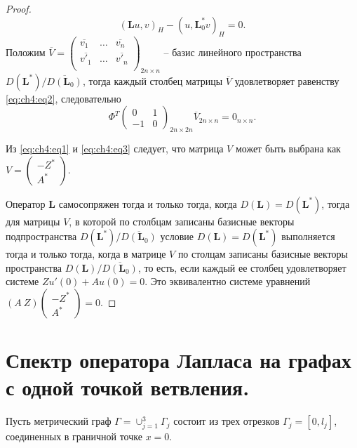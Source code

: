 \begin{proof}
\begin{equation}
\left( \mathbf{L} u, v\right)_H - \left( u, \mathbf{L}_0^* v\right)_H =0.
\label{eq:ch4:eq2}
\end{equation}
Положим $\overline{V} = \begin{pmatrix}
           \overline{v_1} & \ldots & \overline{v_n} \\
           \overline{v'_1} & \ldots & \overline{v'_n} \\
\end{pmatrix}_{2n \times n}$ -- базис линейного пространства $D(\mathbf{L^*}) / \overline{D(\mathbf{L}_0)}$, тогда каждый столбец матрицы $\overline{V}$ удовлетворяет равенству \eqref{eq:ch4:eq2}, следовательно 
\begin{equation}
\Phi^T \begin{pmatrix}
           0 & 1 \\
           -1 & 0
\end{pmatrix}_{2n \times 2n} \overline{V}_{2n \times n} = 0_{n \times n}.
\label{eq:ch4:eq3}
\end{equation}

Из \eqref{eq:ch4:eq1} и \eqref{eq:ch4:eq3} следует, что матрица $V$ может быть выбрана как $V=
\begin{pmatrix}
           -Z^* \\
           A^*
\end{pmatrix}. $

Оператор $\mathbf{L}$ самосопряжен тогда и только тогда, когда $D(\mathbf{L})=D(\mathbf{L}^*)$, тогда для матрицы $V$, в которой по столбцам записаны базисные векторы подпространства  $D(\mathbf{L}^*)/\overline{D(\mathbf{L}_0)}$ условие $D(\mathbf{L})=D(\mathbf{L}^*)$ выполняется тогда и только тогда, когда в матрице $V$ по столцам записаны базисные векторы пространства $D(\mathbf{L})/\overline{D(\mathbf{L}_0)}$, то есть, если каждый ее столбец удовлетворяет системе $Z u'(0) + A u(0) =0$. Это эквивалентно системе уравнений 
$\left( A \  Z \right) \begin{pmatrix}
           -Z^* \\
           A^*
\end{pmatrix} = 0$.
\end{proof}

\section{Спектр оператора Лапласа на графах с одной точкой ветвления.}\label{sec:ch4/sect3}
Пусть метрический граф $\Gamma = \cup_{j=1}^3 \Gamma_j$ состоит из трех отрезков $\Gamma_j = [0, l_j]$, соединенных в граничной точке $x=0$. 

